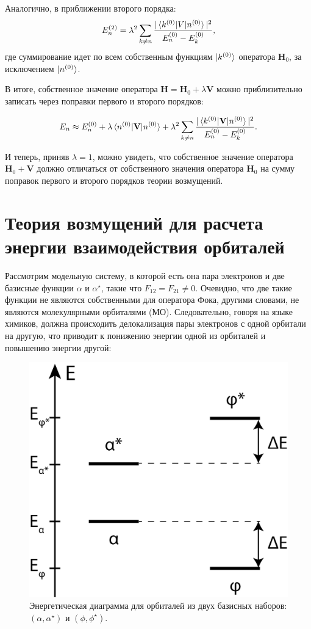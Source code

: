 \documentclass{article}
\begin{document}
Аналогично, в приближении второго порядка:
\begin{equation}
    E_n^{(2)} = \lambda^2 \sum_{k \neq n} \frac{|\braket{k^{(0)}|V|n^{(0)}}|^2}{E_n^{(0)} - E_k^{(0)}},
\end{equation}
где суммирование идет по всем собственным функциям $\ket{k^{(0)}}$ оператора $\textbf{H}_0$, за исключением $\ket{n^{(0)}}$.

В итоге, собственное значение оператора $\textbf{H} = \textbf{H}_0 + \lambda \textbf{V}$ можно приблизительно записать через поправки первого и второго порядков:

\begin{equation}
    E_n \approx E_n^{(0)} + \lambda \braket{n^{(0)}|\textbf{V}|n^{(0)}} + \lambda^2 \sum_{k \neq n} \frac{|\braket{k^{(0)}|\textbf{V}|n^{(0)}}|^2}{E_n^{(0)} - E_k^{(0)}}.
\end{equation}

И теперь, приняв $\lambda = 1$, можно увидеть, что собственное значение оператора $\textbf{H}_0 + \textbf{V}$ должно отличаться от собственного значения оператора $\textbf{H}_0$ на сумму поправок первого и второго порядков теории возмущений.


\section{Теория возмущений для расчета энергии взаимодействия орбиталей}

Рассмотрим модельную систему, в которой есть она пара электронов и две базисные функции $\alpha$ и $\alpha^\star$, такие что $F_{12} = F_{21} \neq 0$. Очевидно, что две такие функции не являются собственными для оператора Фока, другими словами, не являются молекулярными орбиталями (МО). Следовательно, говоря на языке химиков, должна происходить делокализация пары электронов с одной орбитали на другую, что приводит к понижению энергии одной из орбиталей и повышению энергии другой: 

\begin{figure}[h]
\centering
\captionsetup{justification=centering}
\includegraphics[width=0.3\linewidth]{Fig1.png}
\caption{Энергетическая диаграмма для орбиталей из двух базисных наборов: $(\alpha, \alpha^{\star})$ и $(\phi, \phi^{\star})$.}
\label{fig:fig1}
\end{figure}
\end{document}
